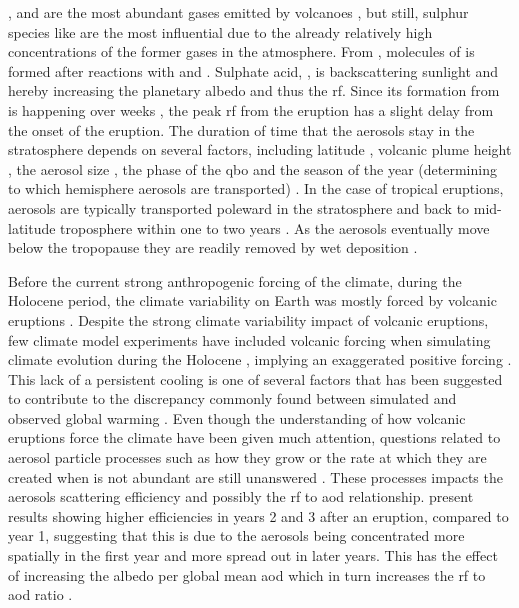 \documentclass{ametsocV6.1}
\begin{document}
,  and  are the most abundant gases emitted by volcanoes
\citep{robock2000}, but still, sulphur species like  are the most influential
due to the already relatively high concentrations of the former gases in the atmosphere.
From , molecules of  is formed after reactions with  and
 \citep{robock2000}. Sulphate acid, , is backscattering sunlight and
hereby increasing the planetary albedo and thus the \gls{rf}. Since its formation from
 is happening over weeks \citep{robock2000}, the peak \gls{rf} from the eruption
has a slight delay from the onset of the eruption. The duration of time that the
 aerosols stay in the stratosphere depends on several factors, including
latitude \citep{marshall2019, toohey2019}, volcanic plume height \citep{marshall2019},
the aerosol size \citep{marshall2019}, the phase of the \gls{qbo} \citep{pitari2016b}
and the season of the year (determining to which hemisphere aerosols are transported)
\citep{toohey2011,toohey2019}. In the case of tropical eruptions, aerosols are typically
transported poleward in the stratosphere and back to mid-latitude troposphere within one
to two years \citep{robock2000}. As the aerosols eventually move below the tropopause
they are readily removed by wet deposition \citep{liu2012}.

Before the current strong anthropogenic forcing of the climate, during the Holocene
period, the climate variability on Earth was mostly forced by volcanic eruptions
\citep{sigl2022}. Despite the strong climate variability impact of volcanic eruptions,
few climate model experiments have included volcanic forcing when simulating climate
evolution during the Holocene \citep{sigl2022}, implying an exaggerated positive forcing
\citep{gregory2016,solomon2011}. This lack of a persistent cooling is one of several
factors that has been suggested to contribute to the discrepancy commonly found between
simulated and observed global warming \citep{andersson2015}. Even though the
understanding of how volcanic eruptions force the climate have been given much
attention, questions related to aerosol particle processes such as how they grow or the
rate at which they are created when  is not abundant are still unanswered
\citep[e.g.][]{robock2000,zanchettin2019,marshall2020,marshall2022}. These processes
impacts the aerosols scattering efficiency and possibly the \gls{rf} to \gls{aod}
relationship. \citet{marshall2020} present results showing higher efficiencies in years
2 and 3 after an eruption, compared to year 1, suggesting that this is due to the
aerosols being concentrated more spatially in the first year and more spread out in
later years. This has the effect of increasing the albedo per global mean \gls{aod}
which in turn increases the \gls{rf} to \gls{aod} ratio \citep{marshall2020}.
\end{document}
